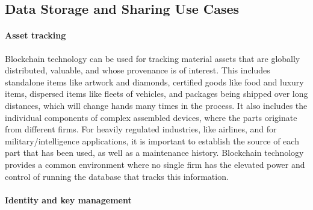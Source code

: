 
\subsection{Data Storage and Sharing Use Cases}

\paragraph{Asset tracking} 

Blockchain technology can be used for tracking material assets that are globally distributed, valuable, and whose provenance is of interest.
This includes standalone items like artwork and diamonds, certified goods like food and luxury items, dispersed items like fleets of vehicles, and packages being shipped over long distances, which will change hands many times in the process. 
It also includes the individual components of complex assembled devices, where the parts originate from different firms. 
For heavily regulated industries, like airlines, and for military/intelligence applications, it is important to establish the source of each part that has been used, as well as a maintenance history.
%
Blockchain technology provides a common environment where no single firm has the elevated power and control of running the database that tracks this information.

\paragraph{Identity and key management}

